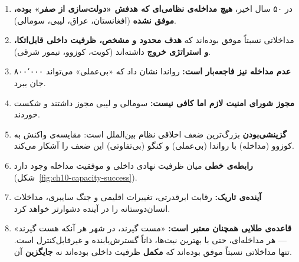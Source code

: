 \begin{tcolorbox}[wavebox, title={یافته‌های کلیدی فصل ۱۰}]
\begin{enumerate}[nosep, label=\textbf{\arabic*.}]
  \item در ۵۰ سال اخیر، \textbf{هیچ مداخله‌ی نظامی‌ای که هدفش «دولت‌سازی از صفر» بوده، موفق نشده} (افغانستان، عراق، لیبی، سومالی).

  \item مداخلاتی نسبتاً موفق بوده‌اند که \textbf{هدف محدود و مشخص، ظرفیت داخلی قابل‌اتکا، و استراتژی خروج} داشته‌اند (کویت، کوزوو، تیمور شرقی).

  \item \textbf{عدم مداخله نیز فاجعه‌بار است:} رواندا نشان داد که «بی‌عملی» می‌تواند ۸۰۰٬۰۰۰ جان ببرد.

  \item \textbf{مجوز شورای امنیت لازم اما کافی نیست:} سومالی و لیبی مجوز داشتند و شکست خوردند.

  \item \textbf{گزینشی‌بودن} بزرگ‌ترین ضعف اخلاقی نظام بین‌الملل است: مقایسه‌ی واکنش به کوزوو (مداخله) با رواندا (بی‌عملی) و کنگو (بی‌تفاوتی) این ضعف را آشکار می‌کند.

  \item \textbf{رابطه‌ی خطی} میان ظرفیت نهادی داخلی و موفقیت مداخله وجود دارد (شکل~\ref{fig:ch10-capacity-success}).

  \item \textbf{آینده‌ی تاریک:} رقابت ابرقدرتی، تغییرات اقلیمی و جنگ سایبری، مداخلات انسان‌دوستانه را در آینده دشوارتر خواهد کرد.

  \item \textbf{قاعده‌ی طلایی همچنان معتبر است:} «مست گیرند، در شهر هر آنکه هست گیرند» — هر مداخله‌ای، حتی با بهترین نیت‌ها، ذاتاً گسترش‌یابنده و غیرقابل‌کنترل است. تنها مداخلاتی نسبتاً موفق بوده‌اند که \textbf{مکمل} ظرفیت داخلی بوده‌اند نه \textbf{جایگزین} آن.
\end{enumerate}
\end{tcolorbox}

\cleardoublepage